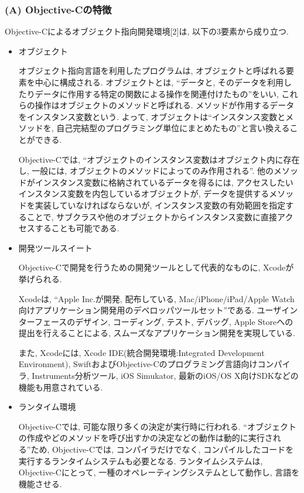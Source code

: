\subsubsection{(A) Objective-Cの特徴}
Objective-Cによるオブジェクト指向開発環境[2]は, 以下の3要素から成り立つ.
\begin{itemize}
\item オブジェクト

オブジェクト指向言語を利用したプログラムは, オブジェクトと呼ばれる要素を中心に構成される.
オブジェクトとは, “データと, そのデータを利用したりデータに作用する特定の関数による操作を関連付けたもの”をいい, これらの操作はオブジェクトのメソッドと呼ばれる.
メソッドが作用するデータをインスタンス変数という.
よって, オブジェクトは“インスタンス変数とメソッドを, 自己完結型のプログラミング単位にまとめたもの”と言い換えることができる.

Objective-Cでは, “オブジェクトのインスタンス変数はオブジェクト内に存在し, 一般には, オブジェクトのメソッドによってのみ作用される”.
他のメソッドがインスタンス変数に格納されているデータを得るには, アクセスしたいインスタンス変数を内包しているオブジェクトが, データを提供するメソッドを実装していなければならないが, インスタンス変数の有効範囲を指定することで, サブクラスや他のオブジェクトからインスタンス変数に直接アクセスすることも可能である.

\item 開発ツールスイート

Objective-Cで開発を行うための開発ツールとして代表的なものに, Xcodeが挙げられる.

Xcodeは, “Apple Inc.が開発, 配布している, Mac/iPhone/iPad/Apple Watch向けアプリケーション開発用のデベロッパツールセット”である.
ユーザインターフェースのデザイン, コーディング, テスト, デバッグ, Apple Storeへの提出を行えることによる, スムーズなアプリケーション開発を実現している.

また, Xcodeには, Xcode IDE(統合開発環境:Integrated Development Environment), SwiftおよびObjective-Cのプログラミング言語向けコンパイラ, Instruments分析ツール, iOS Simukator, 最新のiOS/OS X向けSDKなどの機能も用意されている.

\item ランタイム環境

Objective-Cでは, 可能な限り多くの決定が実行時に行われる.
“オブジェクトの作成やどのメソッドを呼び出すかの決定などの動作は動的に実行される”ため, Objective-Cでは, コンパイラだけでなく, コンパイルしたコードを実行するランタイムシステムも必要となる.
ランタイムシステムは, Objective-Cにとって, 一種のオペレーティングシステムとして動作し, 言語を機能させる.
\end{itemize}

